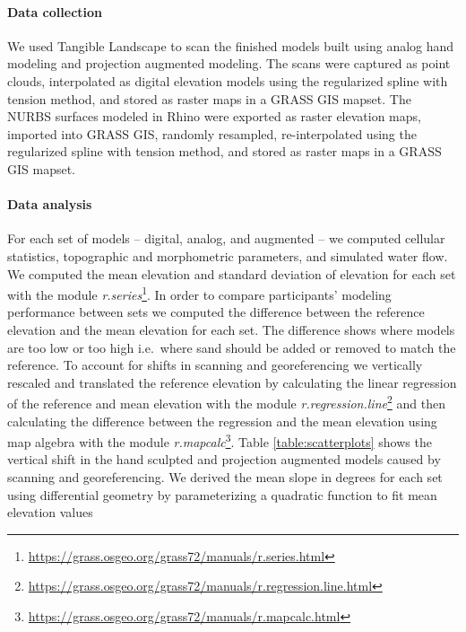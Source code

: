\documentclass[prodmode,acmtochi]{acmsmall} %
\begin{document}
\paragraph{Data collection}
We used Tangible Landscape to scan the finished models 
built using analog hand modeling and projection augmented modeling.
The scans were captured as point clouds, interpolated 
as digital elevation models using the regularized spline with tension method,
and stored as raster maps in a GRASS GIS mapset. 
The NURBS surfaces modeled in Rhino were exported as raster elevation maps,
imported into GRASS GIS, randomly resampled, 
re-interpolated using the regularized spline with tension method, 
and stored as raster maps in a GRASS GIS mapset. 

\paragraph{Data analysis}
For each set of models -- digital, analog, and augmented --
we computed cellular statistics, 
topographic and morphometric parameters, 
and simulated water flow.
We computed 
the mean elevation 
and standard deviation of elevation
for each set
with the module \textit{r.series}\footnote{\url{https://grass.osgeo.org/grass72/manuals/r.series.html}}.
%
In order to compare participants' modeling performance between sets 
we computed the difference 
between the reference elevation and the mean elevation for each set.
%
The difference shows 
where models are too low or too high
i.e.~where sand should be added or removed to match the reference.
To account for shifts in scanning and georeferencing
we vertically rescaled and translated the reference elevation %
by calculating the linear regression of the reference and mean elevation
with the module \textit{r.regression.line}\footnote{\url{https://grass.osgeo.org/grass72/manuals/r.regression.line.html}}
and then calculating the difference between the regression and the mean elevation 
using map algebra 
with the module \textit{r.mapcalc}\footnote{\url{https://grass.osgeo.org/grass72/manuals/r.mapcalc.html}}.
Table \ref{table:scatterplots} shows the vertical shift 
in the hand sculpted and projection augmented models 
caused by scanning and georeferencing.
%
We derived the mean slope in degrees for each set 
using differential geometry
by parameterizing a quadratic function to fit mean elevation values 
\end{document}

